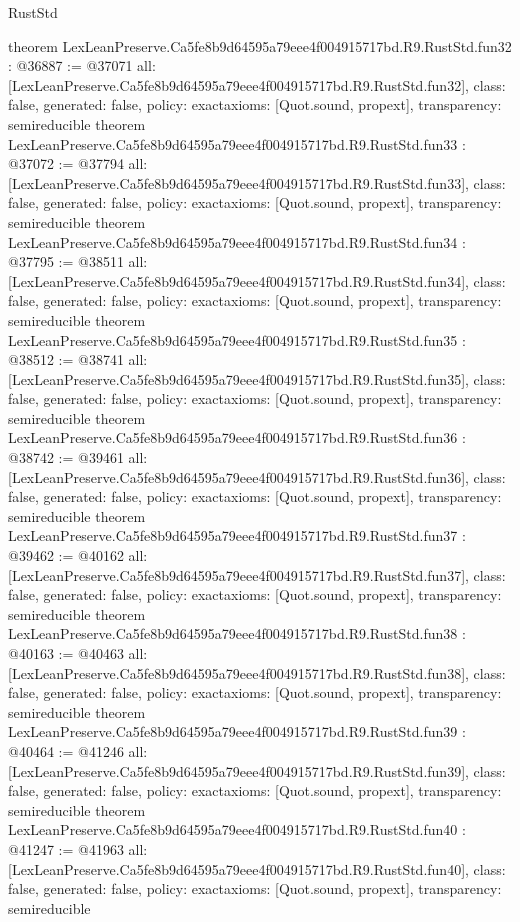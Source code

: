 \begin{lexlean}{RustStd}
\begin{coremodule}
{}
theorem LexLeanPreserve.Ca5fe8b9d64595a79eee4f004915717bd.R9.RustStd.fun32 : @36887 := @37071 {
  all: [LexLeanPreserve.Ca5fe8b9d64595a79eee4f004915717bd.R9.RustStd.fun32],
  class: false,
  generated: false,
  policy: exact{axioms: [Quot.sound, propext]},
  transparency: semireducible
}
theorem LexLeanPreserve.Ca5fe8b9d64595a79eee4f004915717bd.R9.RustStd.fun33 : @37072 := @37794 {
  all: [LexLeanPreserve.Ca5fe8b9d64595a79eee4f004915717bd.R9.RustStd.fun33],
  class: false,
  generated: false,
  policy: exact{axioms: [Quot.sound, propext]},
  transparency: semireducible
}
theorem LexLeanPreserve.Ca5fe8b9d64595a79eee4f004915717bd.R9.RustStd.fun34 : @37795 := @38511 {
  all: [LexLeanPreserve.Ca5fe8b9d64595a79eee4f004915717bd.R9.RustStd.fun34],
  class: false,
  generated: false,
  policy: exact{axioms: [Quot.sound, propext]},
  transparency: semireducible
}
theorem LexLeanPreserve.Ca5fe8b9d64595a79eee4f004915717bd.R9.RustStd.fun35 : @38512 := @38741 {
  all: [LexLeanPreserve.Ca5fe8b9d64595a79eee4f004915717bd.R9.RustStd.fun35],
  class: false,
  generated: false,
  policy: exact{axioms: [Quot.sound, propext]},
  transparency: semireducible
}
theorem LexLeanPreserve.Ca5fe8b9d64595a79eee4f004915717bd.R9.RustStd.fun36 : @38742 := @39461 {
  all: [LexLeanPreserve.Ca5fe8b9d64595a79eee4f004915717bd.R9.RustStd.fun36],
  class: false,
  generated: false,
  policy: exact{axioms: [Quot.sound, propext]},
  transparency: semireducible
}
theorem LexLeanPreserve.Ca5fe8b9d64595a79eee4f004915717bd.R9.RustStd.fun37 : @39462 := @40162 {
  all: [LexLeanPreserve.Ca5fe8b9d64595a79eee4f004915717bd.R9.RustStd.fun37],
  class: false,
  generated: false,
  policy: exact{axioms: [Quot.sound, propext]},
  transparency: semireducible
}
theorem LexLeanPreserve.Ca5fe8b9d64595a79eee4f004915717bd.R9.RustStd.fun38 : @40163 := @40463 {
  all: [LexLeanPreserve.Ca5fe8b9d64595a79eee4f004915717bd.R9.RustStd.fun38],
  class: false,
  generated: false,
  policy: exact{axioms: [Quot.sound, propext]},
  transparency: semireducible
}
theorem LexLeanPreserve.Ca5fe8b9d64595a79eee4f004915717bd.R9.RustStd.fun39 : @40464 := @41246 {
  all: [LexLeanPreserve.Ca5fe8b9d64595a79eee4f004915717bd.R9.RustStd.fun39],
  class: false,
  generated: false,
  policy: exact{axioms: [Quot.sound, propext]},
  transparency: semireducible
}
theorem LexLeanPreserve.Ca5fe8b9d64595a79eee4f004915717bd.R9.RustStd.fun40 : @41247 := @41963 {
  all: [LexLeanPreserve.Ca5fe8b9d64595a79eee4f004915717bd.R9.RustStd.fun40],
  class: false,
  generated: false,
  policy: exact{axioms: [Quot.sound, propext]},
  transparency: semireducible
}
\end{coremodule}
\end{lexlean}
